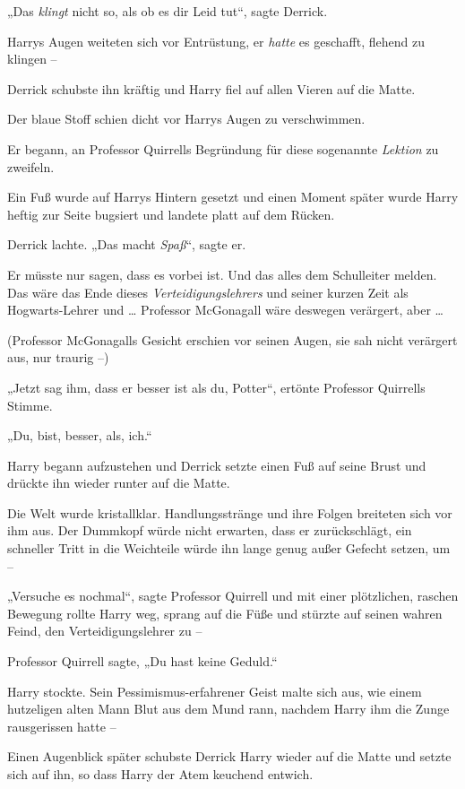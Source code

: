 {„Das \emph{klingt} nicht so, als ob es dir Leid tut“, sagte Derrick.

Harrys Augen weiteten sich vor Entrüstung, er \emph{hatte} es geschafft, flehend zu klingen --

Derrick schubste ihn kräftig und Harry fiel auf allen Vieren auf die Matte.

Der blaue Stoff schien dicht vor Harrys Augen zu verschwimmen.

Er begann, an Professor Quirrells Begründung für diese sogenannte \emph{Lektion} zu zweifeln.

Ein Fuß wurde auf Harrys Hintern gesetzt und einen Moment später wurde Harry heftig zur Seite bugsiert und landete platt auf dem Rücken.

Derrick lachte. „Das macht \emph{Spaß}“, sagte er.

Er müsste nur sagen, dass es vorbei ist. Und das alles dem Schulleiter melden. Das wäre das Ende dieses \emph{Verteidigungslehrers} und seiner kurzen Zeit als Hogwarts-Lehrer und … Professor McGonagall wäre deswegen verärgert, aber …

(Professor McGonagalls Gesicht erschien vor seinen Augen, sie sah nicht verärgert aus, nur traurig --)

„Jetzt sag ihm, dass er besser ist als du, Potter“, ertönte Professor Quirrells Stimme.

„Du, bist, besser, als, ich.“

Harry begann aufzustehen und Derrick setzte einen Fuß auf seine Brust und drückte ihn wieder runter auf die Matte.

Die Welt wurde kristallklar. Handlungsstränge und ihre Folgen breiteten sich vor ihm aus. Der Dummkopf würde nicht erwarten, dass er zurückschlägt, ein schneller Tritt in die Weichteile würde ihn lange genug außer Gefecht setzen, um --

„Versuche es nochmal“, sagte Professor Quirrell und mit einer plötzlichen, raschen Bewegung rollte Harry weg, sprang auf die Füße und stürzte auf seinen wahren Feind, den Verteidigungslehrer zu --

Professor Quirrell sagte, „Du hast keine Geduld.“

Harry stockte. Sein Pessimismus-erfahrener Geist malte sich aus, wie einem hutzeligen alten Mann Blut aus dem Mund rann, nachdem Harry ihm die Zunge rausgerissen hatte --

Einen Augenblick später schubste Derrick Harry wieder auf die Matte und setzte sich auf ihn, so dass Harry der Atem keuchend entwich.

}
